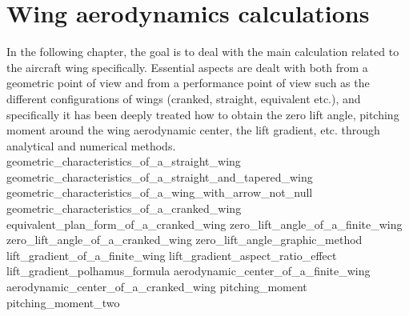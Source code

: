 \documentclass[[12pt,twoside]{book}
\begin{document}
%
%
\chapter%
   [Wing aerodynamics calculations]%
   {Wing aerodynamics calculations}
\label{chap:Wing}

\setcounter{minitocdepth}{2}%
\minitoc %

\vspace{\baselineskip}

\noindent
In the following chapter, the goal is to deal with the main calculation related to the aircraft wing
specifically. Essential aspects are dealt with both from a geometric point of view and from a performance point of view such as the different configurations of wings (cranked, straight, equivalent etc.), and specifically it has been deeply treated 
how to obtain the zero lift angle, pitching moment around the wing aerodynamic center, the lift gradient, etc. through
analytical and numerical methods.
%
{geometric_characteristics_of_a_straight_wing}
{geometric_characteristics_of_a_straight_and_tapered_wing}
{geometric_characteristics_of_a_wing_with_arrow_not_null}
{geometric_characteristics_of_a_cranked_wing}
{equivalent_plan_form_of_a_cranked_wing}
{zero_lift_angle_of_a_finite_wing}
{zero_lift_angle_of_a_cranked_wing}
{zero_lift_angle_graphic_method}
{lift_gradient_of_a_finite_wing}
{lift_gradient_aspect_ratio_effect}
{lift_gradient_polhamus_formula}
{aerodynamic_center_of_a_finite_wing}
{aerodynamic_center_of_a_cranked_wing}
{pitching_moment}
{pitching_moment_two}
\end{document}
